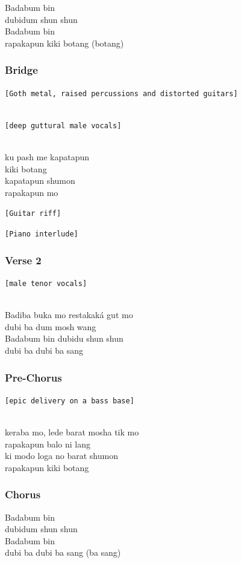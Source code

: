 Badabum bin\\
dubidum shun shun\\
Badabum bin\\
rapakapun kiki botang (botang)

\subsubsection{Bridge}\label{bridge-17}

\texttt{{[}Goth\ metal,\ raised\ percussions\ and\ distorted\ guitars{]}}\strut \\
\texttt{{[}deep\ guttural\ male\ vocals{]}}\strut \\
ku pash me kapatapun\\
kiki botang\\
kapatapun shumon\\
rapakapun mo

\texttt{{[}Guitar\ riff{]}}

\texttt{{[}Piano\ interlude{]}}

\subsubsection{Verse 2}\label{verse-2-18}

\texttt{{[}male\ tenor\ vocals{]}}\strut \\
Badiba buka mo restakaká gut mo\\
dubi ba dum mosh wang\\
Badabum bin dubidu shun shun\\
dubi ba dubi ba sang

\subsubsection{Pre-Chorus}\label{pre-chorus-28}

\texttt{{[}epic\ delivery\ on\ a\ bass\ base{]}}\strut \\
keraba mo, lede barat mosha tik mo\\
rapakapun balo ni lang\\
ki modo loga no barat shumon\\
rapakapun kiki botang

\subsubsection{Chorus}\label{chorus-47}

Badabum bin\\
dubidum shun shun\\
Badabum bin\\
dubi ba dubi ba sang (ba sang)

